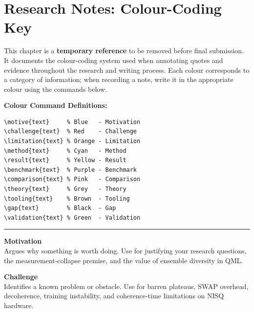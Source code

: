 \documentclass[]{UCD_CS_FYP_Report}
\newcommand{\motive}[1]{{\color{blue}#1}}
\newcommand{\challenge}[1]{{\color{red}#1}}
\newcommand{\limitation}[1]{{\color{orange}#1}}
\newcommand{\method}[1]{{\color{cyan!70!black}#1}}
\newcommand{\result}[1]{{\color{yellow!60!black}#1}}
\newcommand{\benchmark}[1]{{\color{violet}#1}}
\newcommand{\comparison}[1]{{\color{magenta!70!black}#1}}
\newcommand{\theory}[1]{{\color{gray}#1}}
\newcommand{\tooling}[1]{{\color{brown}#1}}
\newcommand{\gap}[1]{{\color{black}\textbf{#1}}}
\newcommand{\validation}[1]{{\color{green!60!black}#1}}
\begin{document}
\maketitle


\tableofcontents
\newpage




\chapter*{Research Notes: Colour-Coding Key}

This chapter is a \textbf{temporary reference} to be removed before final submission. It documents the colour-coding system used when annotating quotes and evidence throughout the research and writing process. Each colour corresponds to a category of information; when recording a note, write it in the appropriate colour using the commands below.

\bigskip

\noindent\textbf{Colour Command Definitions:}

\begin{verbatim}
\motive{text}     % Blue   - Motivation
\challenge{text}  % Red    - Challenge
\limitation{text} % Orange - Limitation
\method{text}     % Cyan   - Method
\result{text}     % Yellow - Result
\benchmark{text}  % Purple - Benchmark
\comparison{text} % Pink   - Comparison
\theory{text}     % Grey   - Theory
\tooling{text}    % Brown  - Tooling
\gap{text}        % Black  - Gap
\validation{text} % Green  - Validation
\end{verbatim}

\noindent\rule{\textwidth}{0.4pt}
\medskip

\motive{\large \textbf{Motivation}\\
\normalsize Argues why something is worth doing. Use for justifying your research questions, the measurement-collapse premise, and the value of ensemble diversity in QML.}

\bigskip

\challenge{\large \textbf{Challenge}\\
\normalsize Identifies a known problem or obstacle. Use for barren plateaus, SWAP overhead, decoherence, training instability, and coherence-time limitations on NISQ hardware.}
\end{document}
